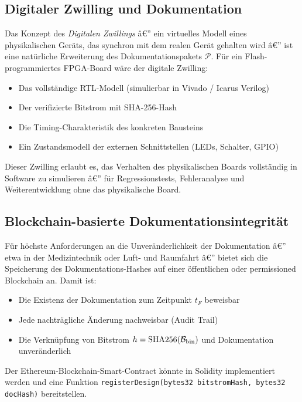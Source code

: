 ﻿\documentclass[a4paper,12pt]{article}
\theoremstyle{definition}
\begin{document}
\subsection{Digitaler Zwilling und Dokumentation}

Das Konzept des \emph{Digitalen Zwillings} â€” ein virtuelles Modell eines
physikalischen Geräts, das synchron mit dem realen Gerät gehalten wird â€”
ist eine natürliche Erweiterung des Dokumentationspakets
$\mathcal{P}$. Für ein Flash-programmiertes FPGA-Board wäre der
digitale Zwilling:
\begin{itemize}
    \item Das vollständige RTL-Modell (simulierbar in Vivado / Icarus Verilog)
    \item Der verifizierte Bitstrom mit SHA-256-Hash
    \item Die Timing-Charakteristik des konkreten Bausteins
    \item Ein Zustandsmodell der externen Schnittstellen (LEDs, Schalter, GPIO)
\end{itemize}

Dieser Zwilling erlaubt es, das Verhalten des physikalischen Boards vollständig
in Software zu simulieren â€” für Regressionstests, Fehleranalyse und
Weiterentwicklung ohne das physikalische Board.

\subsection{Blockchain-basierte Dokumentationsintegrität}

Für höchste Anforderungen an die Unveränderlichkeit der Dokumentation â€”
etwa in der Medizintechnik oder Luft- und Raumfahrt â€” bietet sich die
Speicherung des Dokumentations-Hashes auf einer öffentlichen oder
permissioned Blockchain an. Damit ist:
\begin{itemize}
    \item Die Existenz der Dokumentation zum Zeitpunkt $t_F$ beweisbar
    \item Jede nachträgliche Änderung nachweisbar (Audit Trail)
    \item Die Verknüpfung von Bitstrom $h = \mathrm{SHA256}(\mathcal{B}_{\rm bin})$
          und Dokumentation unveränderlich
\end{itemize}

Der Ethereum-Blockchain-Smart-Contract könnte in Solidity implementiert werden
und eine Funktion \texttt{registerDesign(bytes32 bitstromHash, bytes32 docHash)}
bereitstellen.
\end{document}
